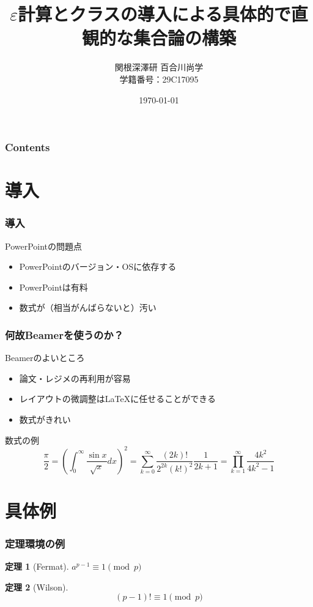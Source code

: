 \documentclass[dvipdfmx,11pt,notheorems]{beamer}
\title{$\varepsilon$計算とクラスの導入による具体的で直観的な集合論の構築}%
\author{関根深澤研 百合川尚学 \\ 学籍番号：29C17095}%
\institute{}%
\date{\today}%
\theoremstyle{definition}
\newtheorem{theorem}{定理}
\begin{document}
\begin{frame}[plain]\frametitle{}
\titlepage %
\end{frame}

\begin{frame}\frametitle{Contents}
\tableofcontents %
\end{frame}

\section{導入}

\begin{frame}\frametitle{導入}
\begin{alertblock}{PowerPointの問題点}
\begin{itemize}
\item PowerPointのバージョン・OSに依存する 
\item PowerPointは有料
\item 数式が（相当がんばらないと）汚い 
\end{itemize}
\end{alertblock}
\end{frame}

\begin{frame}\frametitle{何故Beamerを使うのか？}
\begin{block}{Beamerのよいところ}
\begin{itemize}
\item 論文・レジメの再利用が容易 
\item レイアウトの微調整は\LaTeX に任せることができる 
\item 数式がきれい 
\end{itemize}
\end{block}

\begin{exampleblock}{数式の例} 
\begin{equation*}
\frac{\pi}{2} =\left( \int_{0}^{\infty} \frac{\sin x}{\sqrt{x}} dx \right)^2 =\sum_{k=0}^{\infty} \frac{(2k)!}{2^{2k}(k!)^2} \frac{1}{2k+1} 
=\prod_{k=1}^{\infty} \frac{4k^2}{4k^2 - 1}
\end{equation*}
\end{exampleblock}
\end{frame}


\section{具体例}

\begin{frame}\frametitle{定理環境の例}
\begin{theorem}[Fermat]
$a^{p-1} \equiv 1 \pmod{p}$
\end{theorem}
\pause
\begin{theorem}[Wilson]
\begin{equation}
(p-1)! \equiv 1 \pmod{p}
\end{equation}
\end{theorem}
\end{frame}
\end{document}

